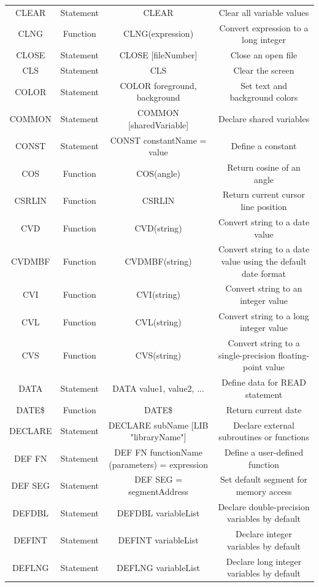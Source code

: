 \documentclass[10pt, reqno]{exam}
\begin{document}
{\begin{longtable}{|c|c|c|c|}
    CLEAR & Statement & CLEAR & Clear all variable values \\
    CLNG & Function & CLNG(expression) & Convert expression to a long integer \\
    CLOSE & Statement & CLOSE [fileNumber] & Close an open file \\
    CLS & Statement & CLS & Clear the screen \\
    COLOR & Statement & COLOR foreground, background & Set text and background colors \\
    COMMON & Statement & COMMON [sharedVariable] & Declare shared variables \\
    CONST & Statement & CONST constantName = value & Define a constant \\
    COS & Function & COS(angle) & Return cosine of an angle \\
    CSRLIN & Function & CSRLIN & Return current cursor line position \\
    CVD & Function & CVD(string) & Convert string to a date value \\
    CVDMBF & Function & CVDMBF(string) & Convert string to a date value using the default date format \\
    CVI & Function & CVI(string) & Convert string to an integer value \\
    CVL & Function & CVL(string) & Convert string to a long integer value \\
    CVS & Function & CVS(string) & Convert string to a single-precision floating-point value \\
    DATA & Statement & DATA value1, value2, ... & Define data for READ statement \\
    DATE\$ & Function & DATE\$ & Return current date \\
    DECLARE & Statement & DECLARE subName [LIB "libraryName"] & Declare external subroutines or functions \\
    DEF FN & Statement & DEF FN functionName (parameters) = expression & Define a user-defined function \\
    DEF SEG & Statement & DEF SEG = segmentAddress & Set default segment for memory access \\
    DEFDBL & Statement & DEFDBL variableList & Declare double-precision variables by default \\
    DEFINT & Statement & DEFINT variableList & Declare integer variables by default \\
    DEFLNG & Statement & DEFLNG variableList & Declare long integer variables by default \\

\end{longtable}}
\end{document}
